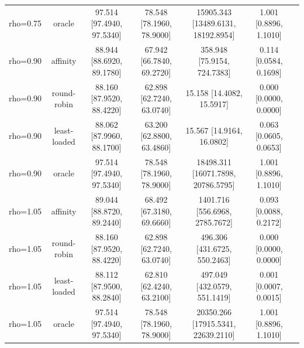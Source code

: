 \begin{table}[t]
\begin{tabular}{lcccccc}
rho=0.75 & oracle & 97.514 \tiny [97.4940, 97.5340] & 78.548 \tiny [78.1960, 78.9000] & 15905.343 \tiny [13489.6131, 18192.8954] & 1.001 \tiny [0.8896, 1.1010] \\
rho=0.90 & affinity & 88.944 \tiny [88.6920, 89.1780] & 67.942 \tiny [66.7840, 69.2720] & 358.948 \tiny [75.9154, 724.7383] & 0.114 \tiny [0.0584, 0.1698] \\
rho=0.90 & round-robin & 88.160 \tiny [87.9520, 88.4220] & 62.898 \tiny [62.7240, 63.0740] & 15.158 \tiny [14.4082, 15.5917] & 0.000 \tiny [0.0000, 0.0000] \\
rho=0.90 & least-loaded & 88.062 \tiny [87.9960, 88.1700] & 63.200 \tiny [62.8800, 63.4860] & 15.567 \tiny [14.9164, 16.0802] & 0.063 \tiny [0.0605, 0.0653] \\
rho=0.90 & oracle & 97.514 \tiny [97.4940, 97.5340] & 78.548 \tiny [78.1960, 78.9000] & 18498.311 \tiny [16071.7898, 20786.5795] & 1.001 \tiny [0.8896, 1.1010] \\
rho=1.05 & affinity & 89.044 \tiny [88.8720, 89.2440] & 68.492 \tiny [67.3180, 69.6660] & 1401.716 \tiny [556.6968, 2785.7672] & 0.093 \tiny [0.0088, 0.2172] \\
rho=1.05 & round-robin & 88.160 \tiny [87.9520, 88.4220] & 62.898 \tiny [62.7240, 63.0740] & 496.306 \tiny [431.6725, 550.2463] & 0.000 \tiny [0.0000, 0.0000] \\
rho=1.05 & least-loaded & 88.112 \tiny [87.9500, 88.2840] & 62.810 \tiny [62.4240, 63.2100] & 497.049 \tiny [432.0579, 551.1419] & 0.001 \tiny [0.0007, 0.0015] \\
rho=1.05 & oracle & 97.514 \tiny [97.4940, 97.5340] & 78.548 \tiny [78.1960, 78.9000] & 20350.266 \tiny [17915.5341, 22639.2110] & 1.001 \tiny [0.8896, 1.1010] \\
\bottomrule
\end{tabular}
\end{table}
